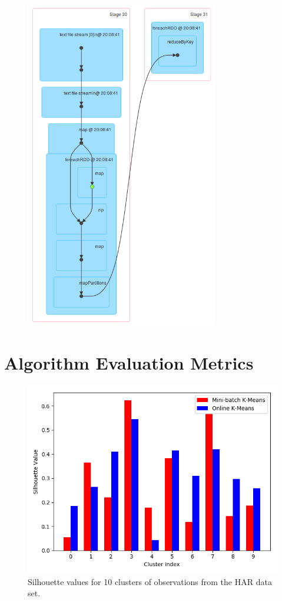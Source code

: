 \documentclass{l4proj}
\begin{document}
\begin{appendices}
\begin{figure}[H]
	\centering
    \includegraphics[width=0.75\textwidth]{images/DAG8}
    \label{fig:dag8}
\end{figure}

\chapter{Algorithm Evaluation Metrics}

\begin{figure}[H]
	\centering
    \includegraphics[width=1.0\textwidth]{images/result20}
    \caption{Silhouette values for 10 clusters of observations from the HAR data set.} 
    \label{fig:res20}
\end{figure}


\end{appendices}
\end{document}
